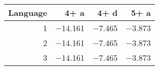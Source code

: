 \begin{tabular}{rrrr}
\toprule
   Language &    4+ a &   4+ d &   5+ a \\
\midrule
          1 & \num{-14.161} & \num{-7.465} & \num{-3.873} \\
          2 & \num{-14.161} & \num{-7.465} & \num{-3.873} \\
          3 & \num{-14.161} & \num{-7.465} & \num{-3.873} \\
\bottomrule
\end{tabular}